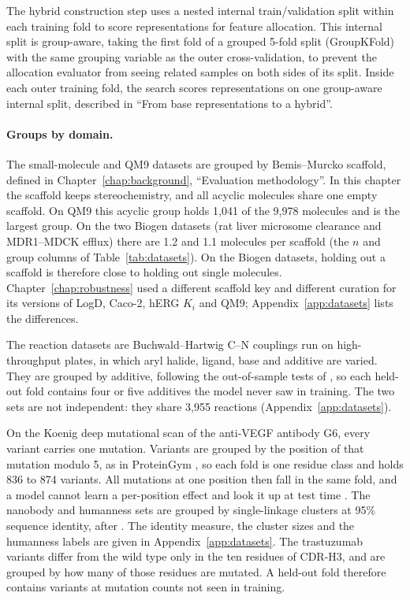 The hybrid construction step uses a nested internal train/validation split within each training fold to score representations for feature allocation. This internal split is group-aware, taking the first fold of a grouped 5-fold split (GroupKFold) with the same grouping variable as the outer cross-validation, to prevent the allocation evaluator from seeing related samples on both sides of its split.
Inside each outer training fold, the search scores representations on one group-aware internal split, described in ``From base representations to a hybrid''.

\paragraph{Groups by domain.} The small-molecule and QM9 datasets are grouped by Bemis--Murcko scaffold, defined in Chapter~\ref{chap:background}, ``Evaluation methodology''. In this chapter the scaffold keeps stereochemistry, and all acyclic molecules share one empty scaffold. On QM9 this acyclic group holds 1,041 of the 9,978 molecules and is the largest group. On the two Biogen datasets (rat liver microsome clearance and MDR1--MDCK efflux) there are 1.2 and 1.1 molecules per scaffold (the $n$ and group columns of Table~\ref{tab:datasets}). On the Biogen datasets, holding out a scaffold is therefore close to holding out single molecules. Chapter~\ref{chap:robustness} used a different scaffold key and different curation for its versions of LogD, Caco-2, hERG $K_i$ and QM9; Appendix~\ref{app:datasets} lists the differences.

The reaction datasets are Buchwald--Hartwig C--N couplings run on high-throughput plates, in which aryl halide, ligand, base and additive are varied. They are grouped by additive, following the out-of-sample tests of \citet{Ahneman2018}, so each held-out fold contains four or five additives the model never saw in training. The two sets are not independent: they share 3,955 reactions (Appendix~\ref{app:datasets}).

On the Koenig deep mutational scan of the anti-VEGF antibody G6, every variant carries one mutation. Variants are grouped by the position of that mutation modulo 5, as in ProteinGym \citep{Notin2023}, so each fold is one residue class and holds 836 to 874 variants. All mutations at one position then fall in the same fold, and a model cannot learn a per-position effect and look it up at test time \citep{Vieira2026}. The nanobody and humanness sets are grouped by single-linkage clusters at 95\% sequence identity, after \citet{Kenlay2024}. The identity measure, the cluster sizes and the humanness labels are given in Appendix~\ref{app:datasets}. The trastuzumab variants differ from the wild type only in the ten residues of CDR-H3, and are grouped by how many of those residues are mutated. A held-out fold therefore contains variants at mutation counts not seen in training.

